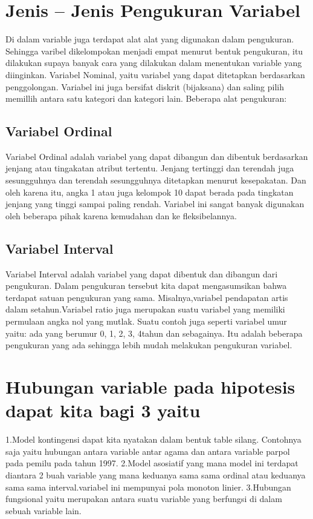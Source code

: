 \section{Jenis – Jenis Pengukuran Variabel}
Di dalam variable juga terdapat alat alat yang digunakan dalam pengukuran. Sehingga varibel dikelompokan menjadi empat menurut bentuk   
pengukuran, itu dilakukan supaya banyak cara yang dilakukan dalam menentukan variable yang diinginkan. Variabel Nominal, yaitu variabel
yang dapat ditetapkan berdasarkan penggolongan. Variabel ini juga bersifat diskrit (bijaksana) dan saling pilih memillih antara satu 
kategori dan kategori lain. Beberapa alat pengukuran:

\subsection{Variabel Ordinal}
Variabel Ordinal adalah variabel yang dapat dibangun dan dibentuk berdasarkan jenjang atau tingakatan atribut tertentu. Jenjang 
tertinggi dan terendah juga sesungguhnya dan terendah sesungguhnya ditetapkan menurut kesepakatan. Dan oleh karena itu, angka 1 atau 
juga kelompok 10 dapat berada pada tingkatan jenjang yang tinggi sampai paling rendah. Variabel ini sangat banyak digunakan oleh 
beberapa pihak karena kemudahan dan ke fleksibelannya.

\subsection{Variabel Interval}
Variabel Interval adalah variabel yang dapat dibentuk dan dibangun dari pengukuran. Dalam pengukuran tersebut kita dapat mengasumsikan 
bahwa terdapat satuan pengukuran yang sama. Misalnya,variabel pendapatan artis dalam setahun.Variabel ratio juga merupakan suatu 
variabel yang memiliki permulaan angka nol yang mutlak. Suatu contoh juga seperti variabel umur yaitu: ada yang berumur 0, 1, 2, 3, 
4tahun dan sebagainya. Itu adalah beberapa pengukuran yang ada sehingga lebih mudah melakukan pengukuran variabel.

\section{Hubungan variable pada hipotesis dapat kita bagi 3 yaitu}
1.Model kontingensi dapat kita nyatakan dalam bentuk table silang. Contohnya saja yaitu hubungan antara variable antar agama dan antara 
variable parpol pada pemilu pada tahun 1997. 
2.Model asosiatif yang mana model ini terdapat diantara 2 buah variable yang mana keduanya sama sama ordinal atau keduanya sama sama 
interval.variabel ini mempunyai pola monoton linier.
3.Hubungan fungsional yaitu merupakan antara suatu variable yang berfungsi di dalam sebuah variable lain.

